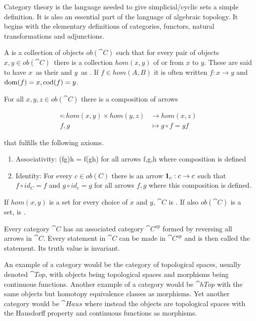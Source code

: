 \documentclass[../../main.tex]{subfiles}
\begin{document}
    Category theory is the language needed to give simplicial/cyclic sets a simple definition. It is also an essential part of the language of algebraic topology. It begins with the elementary definitions of categories, functors, natural transformations and adjunctions.

    \begin{definition}
        A  is a collection of objects $ob(\cat{C})$ such that for every pair of objects $x, y \in ob(\cat{C})$ there is a collection $hom(x, y)$ of  or  from $x$ to $y$. These are said to have $x$ as their  and $y$ as . If $f \in hom(A, B)$ it is often written $f: x \to y$ and $\domain{f} = x, \codomain{f} = y$.
        
        For all $x, y, z \in ob(\cat{C})$ there is a composition of arrows 
        
        \begin{align*}
            \circ: hom(x, y) \times hom(y, z) &\to hom(x, z) \\ 
            f, g &\mapsto g \circ f = gf
        \end{align*}
        
        that fulfills the following axioms.

        \begin{enumerate}
            \item Associativity: (fg)h = f(gh) for all arrows f,g,h where composition is defined
            \item Identity: For every $c \in ob(C)$ there is an arrow $\idarrow[c]: c \to c$ such that $f \circ id_C = f$ and $g \circ id_c = g$ for all arrows $f, g$ where this composition is defined.
        \end{enumerate}
    \end{definition}

    \begin{definition}
        If $hom(x, y)$ is a set for every choice of $x$ and $y$, $\cat{C}$ is . If also $ob(\cat{C})$ is a set,  is . 
    \end{definition}
    
    Every category $\cat{C}$ has an associated category $\cat{C^{op}}$ formed by reversing all arrows in $\cat{C}$. Every statement in $\cat{C}$ can be made in $\cat{C^{op}}$ and is then called the  statement. Its truth value is invariant.

    \begin{example}
        An example of a category would be the category of topological spaces, usually denoted $\cat{Top}$, with objects being topological spaces and morphisms being continuous functions. Another example of a category would be $\cat{hTop}$ with the same objects but homotopy equivalence classes as morphisms. Yet another category would be $\cat{Haus}$ where instead the objects are topological spaces with the Hausdorff property and continuous functions as morphisms.
    \end{example}
\end{document}

